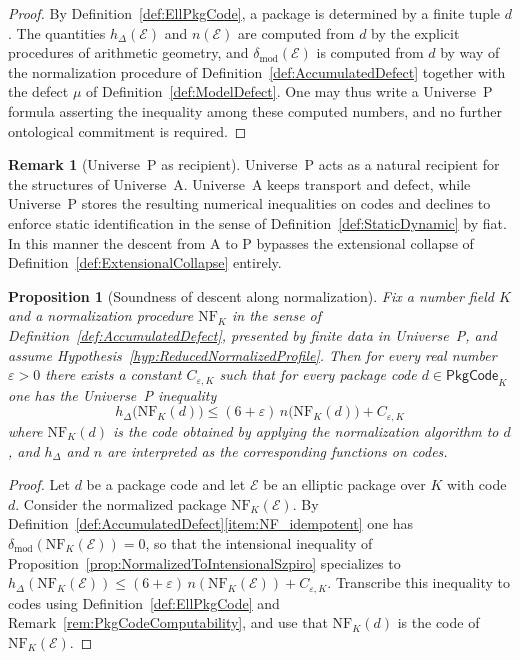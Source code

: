 \documentclass[10pt, reqno]{amsart}
\theoremstyle{plain}
\newtheorem{proposition}[theorem]{Proposition}
\theoremstyle{definition}
\newtheorem{remark}[theorem]{Remark}
\theoremstyle{plain}
\newcommand{\defect}{\delta_{\mathrm{mod}}}
\begin{document}
\begin{proof}
By Definition~\ref{def:EllPkgCode}, a package is determined by a finite tuple $d$. The quantities $h_\Delta(\mathcal{E})$ and $n(\mathcal{E})$ are computed from $d$ by the explicit procedures of arithmetic geometry, and $\defect(\mathcal{E})$ is computed from $d$ by way of the normalization procedure of Definition~\ref{def:AccumulatedDefect} together with the defect $\mu$ of Definition~\ref{def:ModelDefect}. One may thus write a Universe~P formula asserting the inequality among these computed numbers, and no further ontological commitment is required.
\end{proof}

\begin{remark}[Universe~P as recipient]\label{rem:PAsTarget}
Universe~P acts as a natural recipient for the structures of Universe~A. Universe~A keeps transport and defect, while Universe~P stores the resulting numerical inequalities on codes and declines to enforce static identification in the sense of Definition~\ref{def:StaticDynamic} by fiat. In this manner the descent from A to P bypasses the extensional collapse of Definition~\ref{def:ExtensionalCollapse} entirely.
\end{remark}

\begin{proposition}[Soundness of descent along normalization]\label{prop:SoundnessDescentNormalization}
Fix a number field $K$ and a normalization procedure $\mathrm{NF}_K$ in the sense of Definition~\ref{def:AccumulatedDefect}, presented by finite data in Universe~P, and assume Hypothesis~\ref{hyp:ReducedNormalizedProfile}. Then for every real number $\varepsilon>0$ there exists a constant $C_{\varepsilon,K}$ such that for every package code $d \in \mathsf{PkgCode}_K$ one has the Universe~P inequality
\[
h_\Delta\bigl(\mathrm{NF}_K(d)\bigr)
\le
(6+\varepsilon)\,n\bigl(\mathrm{NF}_K(d)\bigr) + C_{\varepsilon,K}
\]
where $\mathrm{NF}_K(d)$ is the code obtained by applying the normalization algorithm to $d$, and $h_\Delta$ and $n$ are interpreted as the corresponding functions on codes.
\end{proposition}

\begin{proof}
Let $d$ be a package code and let $\mathcal{E}$ be an elliptic package over $K$ with code $d$. Consider the normalized package $\mathrm{NF}_K(\mathcal{E})$. By Definition~\ref{def:AccumulatedDefect}\textup{\ref{item:NF_idempotent}} one has $\defect(\mathrm{NF}_K(\mathcal{E}))=0$, so that the intensional inequality of Proposition~\ref{prop:NormalizedToIntensionalSzpiro} specializes to $h_\Delta(\mathrm{NF}_K(\mathcal{E})) \le (6+\varepsilon)\,n(\mathrm{NF}_K(\mathcal{E})) + C_{\varepsilon,K}$. Transcribe this inequality to codes using Definition~\ref{def:EllPkgCode} and Remark~\ref{rem:PkgCodeComputability}, and use that $\mathrm{NF}_K(d)$ is the code of $\mathrm{NF}_K(\mathcal{E})$.
\end{proof}
\end{document}
